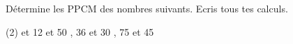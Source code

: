 %
%
Détermine les PPCM des nombres suivants. Ecris tous tes calculs.
    \begin{tasks}(2)
         et 12
         et 50
        , 36 et 30
        , 75 et 45
    \end{tasks}
